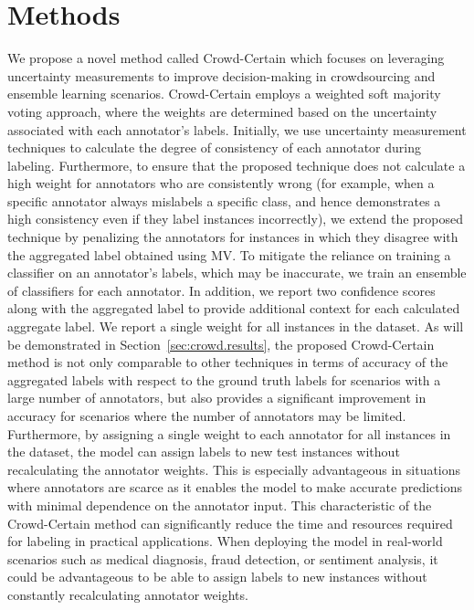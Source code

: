 \section{Methods}\label{sec:crowd.method}
We propose a novel method called Crowd-Certain which focuses on leveraging uncertainty measurements to improve decision-making in crowdsourcing and ensemble learning scenarios. Crowd-Certain employs a weighted soft majority voting approach, where the weights are determined based on the uncertainty associated with each annotator's labels. Initially, we use uncertainty measurement techniques to calculate the degree of consistency of each annotator during labeling. Furthermore, to ensure that the proposed technique does not calculate a high weight for annotators who are consistently wrong (for example, when a specific annotator always mislabels a specific class, and hence demonstrates a high consistency even if they label instances incorrectly), we extend the proposed technique by penalizing the annotators for instances in which they disagree with the aggregated label obtained using MV\@. To mitigate the reliance on training a classifier on an annotator's labels, which may be inaccurate, we train an ensemble of classifiers for each annotator. In addition, we report two confidence scores along with the aggregated label to provide additional context for each calculated aggregate label. We report a single weight for all instances in the dataset. As will be demonstrated in Section~\ref{sec:crowd.results}, the proposed Crowd-Certain method is not only comparable to other techniques in terms of accuracy of the aggregated labels with respect to the ground truth labels for scenarios with a large number of annotators, but also provides a significant improvement in accuracy for scenarios where the number of annotators may be limited. Furthermore, by assigning a single weight to each annotator for all instances in the dataset, the model can assign labels to new test instances without recalculating the annotator weights. This is especially advantageous in situations where annotators are scarce as it enables the model to make accurate predictions with minimal dependence on the annotator input. This characteristic of the Crowd-Certain method can significantly reduce the time and resources required for labeling in practical applications. When deploying the model in real-world scenarios such as medical diagnosis, fraud detection, or sentiment analysis, it could be advantageous to be able to assign labels to new instances without constantly recalculating annotator weights.
